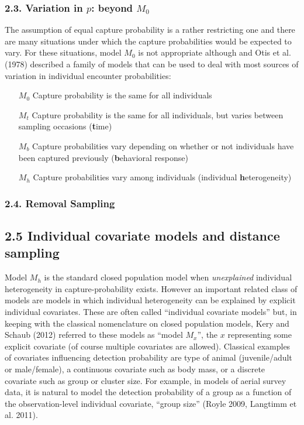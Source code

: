 \documentclass{book}
\begin{document}
\subsubsection*{2.3. Variation in $p$: beyond $M_0$}

The assumption of equal capture probability is a rather restricting
one and there are many situations under which the capture
probabilities would be expected to vary. For these situations, model
$M_0$ is not appropriate although and Otis et al. (1978) described a
family of models that can be used to deal with most sources of
variation in individual encounter probabilities:

\begin{itemize}
\item[$M_0$] Capture probability is the same for all individuals
\item[$M_t$] Capture probability is the same for all individuals, but varies between sampling occasions (\textbf{t}ime)
\item[$M_b$] Capture probabilities vary depending on whether or not individuals have been captured previously (\textbf{b}ehavioral response)
\item[$M_h$] Capture probabilities vary among individuals (individual \textbf{h}eterogeneity)
\end{itemize}


\subsubsection*{2.4. Removal Sampling}


\subsection*{2.5 Individual covariate models and distance sampling}

Model $M_h$ is the standard closed population model when {\it
  unexplained} individual heterogeneity in capture-probability
exists. However an important related class of models are models in
which individual heterogeneity can be explained by explicit individual
covariates. These are often called ``individual covariate models''
but, in keeping with the classical nomenclature on closed population
models, Kery and Schaub (2012) referred to these models as ``model
$M_{x}$'', the $x$ representing some explicit covariate (of course
multiple covariates are allowed).  Classical examples of covariates
influencing detection probability are type of animal (juvenile/adult
or male/female), a continuous covariate such as body mass, or a
discrete covariate such as group or cluster size. For example, in
models of aerial survey data, it is natural to model the detection
probability of a group as a function of the observation-level
individual covariate, ``group size'' (Royle 2009, Langtimm et
al. 2011).
\end{document}

